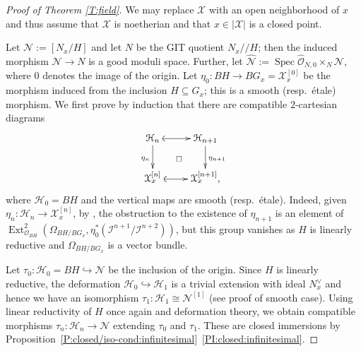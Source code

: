 \documentclass[a4paper]{amsart}
\theoremstyle{plain}
\theoremstyle{definition}
\theoremstyle{remark}
\numberwithin{equation}{section}
\newcommand{\inj}{\hookrightarrow} %
\newcommand\cH{\mathcal{H}}
\newcommand\cI{\mathcal{I}}
\newcommand\cN{\mathcal{N}}
\newcommand\cX{\mathcal{X}}
\newcommand\oh{\mathcal{O}}
\newcommand\co{\colon}
\DeclareMathOperator{\Spec}{Spec}
\newcommand{\gitq}{/\!\!/}
\renewcommand{\hat}{\widehat}
\newcommand{\itemref}[1]{\eqref{#1}}
\DeclareMathOperator{\Ext}{Ext}
\begin{document}
\begin{proof}[Proof of Theorem \ref{T:field}]
We may replace $\cX$ with an open neighborhood of $x$ and thus assume that
$\cX$ is noetherian and that $x \in |\cX|$ is a closed point.

Let $\cN := [N_x / H]$ and let $N$ be the GIT quotient $N_x \gitq H$; then the induced morphism $\cN \to N$ is a good moduli space. Further, let $\hat{\cN} := \Spec \hat{\oh}_{N,0} \times_N \cN$, where $0$ denotes the image of the origin. 
Let $\eta_0 \co BH \to BG_x = \cX_x^{[0]}$ be the morphism induced from the inclusion $H \subseteq G_x$; this is a smooth (resp.\ \'etale) morphism.  We first prove by induction that there are compatible $2$-cartesian diagrams
\[
\xymatrix{\cH_n \ar[d]_{\eta_n} \ar@{(->}[r] & \cH_{n+1} \ar[d]^{\eta_{n+1}} \\
\cX_x^{[n]} \ar@{(->}[r] \ar@{}[ur]|\square& \cX_x^{[n+1]},}
\]
where $\cH_0 = BH$ and the vertical maps are
smooth (resp.\ \'etale).  Indeed, given $\eta_n \co \cH_n \to \cX_x^{[n]}$, by \cite{olsson-defn}, the obstruction to
the existence of $\eta_{n+1}$ is an element of $
\Ext^2_{\oh_{BH}}(\Omega_{BH/BG_x},\eta_0^*(\cI^{n+1}/\cI^{n+2}))$, but this group vanishes as $H$ is linearly reductive and $\Omega_{BH/BG_x}$ is a vector bundle.

Let $\tau_0 \co \cH_0 = BH \hookrightarrow \cN$ be the inclusion of the origin. Since $H$ is linearly reductive, the
deformation $\cH_0\inj \cH_1$ is a trivial extension with ideal $N_x^\vee$ and hence we
have
an isomorphism $\tau_1\colon \cH_1\cong \cN^{[1]}$ (see proof of smooth
case). Using linear reductivity of $H$ once again and deformation theory, we
obtain compatible morphisms $\tau_n \colon \cH_n \to \cN$ extending $\tau_0$
and $\tau_1$. These are closed immersions by
Proposition~\ref{P:closed/iso-cond:infinitesimal}~\itemref{PI:closed:infinitesimal}.


\end{proof}
\end{document}
